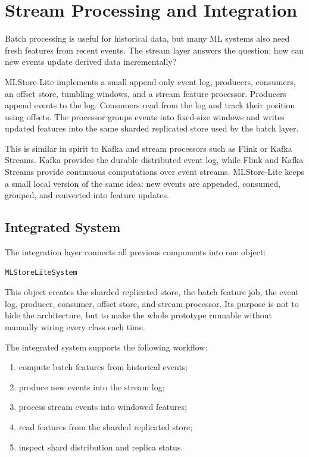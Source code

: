\section{Stream Processing and Integration}

Batch processing is useful for historical data, but many ML systems also need
fresh features from recent events. The stream layer answers the question: how
can new events update derived data incrementally?

MLStore-Lite implements a small append-only event log, producers, consumers, an
offset store, tumbling windows, and a stream feature processor. Producers append
events to the log. Consumers read from the log and track their position using
offsets. The processor groups events into fixed-size windows and writes updated
features into the same sharded replicated store used by the batch layer.

This is similar in spirit to Kafka and stream processors such as Flink or Kafka
Streams. Kafka provides the durable distributed event log, while Flink and Kafka
Streams provide continuous computations over event streams. MLStore-Lite keeps a
small local version of the same idea: new events are appended, consumed, grouped,
and converted into feature updates.

\subsection{Integrated System}

The integration layer connects all previous components into one object:

\begin{verbatim}
MLStoreLiteSystem
\end{verbatim}

This object creates the sharded replicated store, the batch feature job, the
event log, producer, consumer, offset store, and stream processor. Its purpose is
not to hide the architecture, but to make the whole prototype runnable without
manually wiring every class each time.

The integrated system supports the following workflow:

\begin{enumerate}
    \item compute batch features from historical events;
    \item produce new events into the stream log;
    \item process stream events into windowed features;
    \item read features from the sharded replicated store;
    \item inspect shard distribution and replica status.
\end{enumerate}

